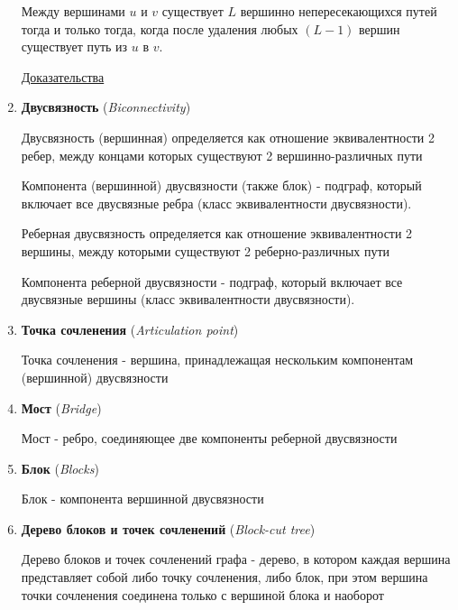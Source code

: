 \documentclass[12pt]{article}
\begin{document}
\begin{enumerate}
        Между вершинами $u$ и $v$ существует $L$ вершинно непересекающихся путей тогда и только тогда,
        когда после удаления любых $(L - 1)$ вершин существует путь из $u$ в $v$.

        \href{https://neerc.ifmo.ru/wiki/index.php?title=%D0%A2%D0%B5%D0%BE%D1%80%D0%B5%D0%BC%D0%B0_%D0%9C%D0%B5%D0%BD%D0%B3%D0%B5%D1%80%D0%B0#.D0.A2.D0.B5.D0.BE.D1.80.D0.B5.D0.BC.D0.B0}{Доказательства}


        \item \textbf{Двусвязность} (\textit{Biconnectivity})

        Двусвязность (вершинная) определяется как отношение эквивалентности 2 ребер, между концами которых существуют 2 вершинно-различных пути  %

        Компонента (вершинной) двусвязности (также блок) - подграф, который включает все двусвязные ребра (класс эквивалентности двусвязности).

        Реберная двусвязность определяется как отношение эквивалентности 2 вершины, между которыми существуют 2 реберно-различных пути

        Компонента реберной двусвязности - подграф, который включает все двусвязные вершины (класс эквивалентности двусвязности).

        \item \textbf{Точка сочленения} (\textit{Articulation point})

        Точка сочленения - вершина, принадлежащая нескольким компонентам (вершинной) двусвязности

        \item \textbf{Мост} (\textit{Bridge})

        Мост - ребро, соединяющее две компоненты реберной двусвязности

        \item \textbf{Блок} (\textit{Blocks})

        Блок - компонента вершинной двусвязности

        \item \textbf{Дерево блоков и точек сочленений} (\textit{Block-cut tree})

        Дерево блоков и точек сочленений графа - дерево, в котором каждая вершина представляет собой либо точку сочленения, либо блок,
        при этом вершина точки сочленения соединена только с вершиной блока и наоборот


    \end{enumerate}
\end{document}
